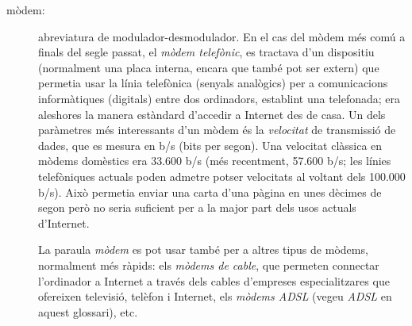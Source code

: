 \begin{description}
\item[mòdem:] abreviatura de modulador-desmodulador. En el cas del
  mòdem més comú a finals del segle passat, el \emph{mòdem telefònic},
  es tractava d'un dispositiu (normalment una placa interna, encara
  que també pot ser extern) que permetia usar la línia telefònica
  (senyals analògics) per a comunicacions informàtiques (digitals)
  entre dos ordinadors, establint una telefonada; era aleshores la
  manera estàndard d'accedir a Internet des de casa. Un dels
  paràmetres més interessants d'un mòdem és la
  \emph{velocitat} de transmissió de dades, que es mesura en b/s (bits
  per segon). Una velocitat clàssica en mòdems domèstics era 33.600
  b/s (més recentment, 57.600 b/s; les línies telefòniques actuals
  poden admetre potser velocitats al voltant dels 100.000 b/s).  Això
  permetia enviar una carta d'una pàgina en unes dècimes de segon però
  no seria suficient per a la major part dels usos actuals d'Internet.

  La paraula \emph{mòdem} es pot usar també per a altres tipus de
  mòdems, normalment més ràpids: els \emph{mòdems de cable}, que
  permeten connectar l'ordinador a Internet a través dels cables
  d'empreses especialitzares que ofereixen televisió, telèfon i
  Internet, els \emph{mòdems ADSL} (vegeu \emph{ADSL} en aquest
  glossari), etc.



\end{description}

